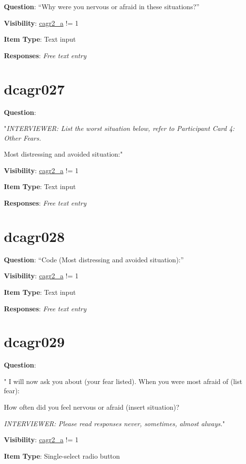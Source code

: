 \documentclass[]{book}
\begin{document}
\textbf{Question}: ``Why were you nervous or afraid in these situations?''

\textbf{Visibility}: \protect\hyperlink{cagr2_a}{cagr2\_a} != 1

\textbf{Item Type}: Text input

\textbf{Responses}: \emph{Free text entry}

\hypertarget{dcagr027}{%
\section{dcagr027}\label{dcagr027}}

\textbf{Question}:

"\emph{INTERVIEWER: List the worst situation below, refer to Participant Card 4: Other Fears.}

Most distressing and avoided situation:"

\textbf{Visibility}: \protect\hyperlink{cagr2_a}{cagr2\_a} != 1

\textbf{Item Type}: Text input

\textbf{Responses}: \emph{Free text entry}

\hypertarget{dcagr028}{%
\section{dcagr028}\label{dcagr028}}

\textbf{Question}: ``Code (Most distressing and avoided situation):''

\textbf{Visibility}: \protect\hyperlink{cagr2_a}{cagr2\_a} != 1

\textbf{Item Type}: Text input

\textbf{Responses}: \emph{Free text entry}

\hypertarget{dcagr029}{%
\section{dcagr029}\label{dcagr029}}

\textbf{Question}:

"
I will now ask you about (your fear listed). When you were most afraid of (list fear):

How often did you feel nervous or afraid (insert situation)?

\emph{INTERVIEWER: Please read responses never, sometimes, almost always.}"

\textbf{Visibility}: \protect\hyperlink{cagr2_a}{cagr2\_a} != 1

\textbf{Item Type}: Single-select radio button
\end{document}
